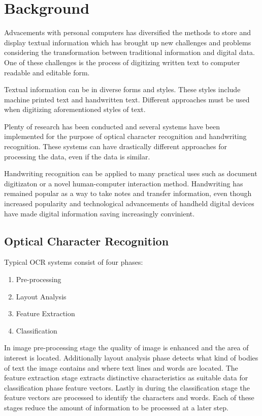 \documentclass{article}
\begin{document}
  \newpage
  \section{Background}
    Advacements with personal computers has diversified the methods to store and display textual information which has brought up new challenges and problems considering the transformation between traditional information and digital data. One of these challenges is the process of digitizing written text to computer readable and editable form.

    Textual information can be in diverse forms and styles. These styles include machine printed text and handwritten text. Different approaches must be used when digitizing aforementioned styles of text.

    Plenty of research has been conducted and several systems have been implemented for the purpose of optical character recognition and handwriting recognition. These systems can have drastically different approaches for processing the data, even if the data is similar.

    Handwriting recognition can be applied to many practical uses such as document digitizaton or a novel human-computer interaction method. Handwriting has remained popular as a way to take notes and transfer information, even though increased popularity and technological advancements of handheld digital devices have made digital information saving increasingly convinient.

  \subsection{Optical Character Recognition}

    Typical OCR systems consist of four phases:

    \begin{enumerate}
      \item{Pre-processing}
      \item{Layout Analysis}
      \item{Feature Extraction}
      \item{Classification}
    \end{enumerate}

    In image pre-processing stage the quality of image is enhanced and the area of interest is located. Additionally layout analysis phase detects what kind of bodies of text the image contains and where text lines and words are located. The feature extraction stage extracts distinctive characteristics as suitable data for classification phase feature vectors. Lastly in during the classification stage the feature vectors are processed to identify the characters and words. Each of these stages reduce the amount of information to be processed at a later step. \cite{Cheriet2007}
\end{document}
